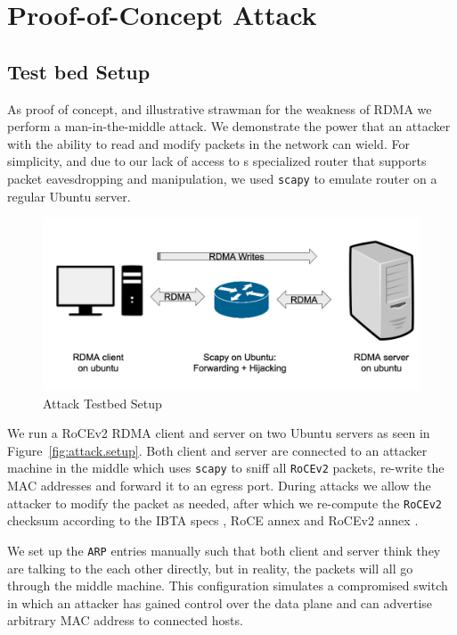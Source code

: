 \section{Proof-of-Concept Attack}
\label{sec:poc.attack}

\subsection{Test bed Setup}
\label{sec:attack.setup}

As proof of concept, and illustrative strawman for the weakness of RDMA we
perform a man-in-the-middle attack. We demonstrate the power that an attacker
with the ability to read and modify packets in the network can wield. For
simplicity, and due to our lack of access to s specialized router that supports
packet eavesdropping and manipulation, we used \texttt{scapy} to emulate router
on a regular Ubuntu server.

\begin{figure}[ht]
    \centering
    \includegraphics[width=0.5\textwidth - 5pt]{fig/attack_setup}
    \caption{Attack Testbed Setup}
    \label{fig:attack.setup}
\end{figure}

We run a RoCEv2 RDMA client and server on two Ubuntu servers as seen in
Figure~\autoref{fig:attack.setup}. Both client and server are connected to an
attacker machine in the middle which uses \texttt{scapy} to sniff all
\texttt{RoCEv2} packets, re-write the MAC addresses and forward it to an egress
port. During attacks we allow the attacker to modify the packet as needed, after
which we re-compute the \texttt{RoCEv2} checksum according to the IBTA specs
\cite{infiniband:iba.spec.vol1.v1.3}, RoCE annex
\cite{infiniband:iba.spec.annex.roce} and RoCEv2 annex
\cite{infiniband:iba.spec.annex.rocev2}.

We set up the \texttt{ARP} entries manually such that both client and server
think they are talking to the each other directly, but in reality, the packets
will all go through the middle machine. This configuration simulates a
compromised switch in which an attacker has gained control over the data plane
and can advertise arbitrary MAC address to connected hosts.

